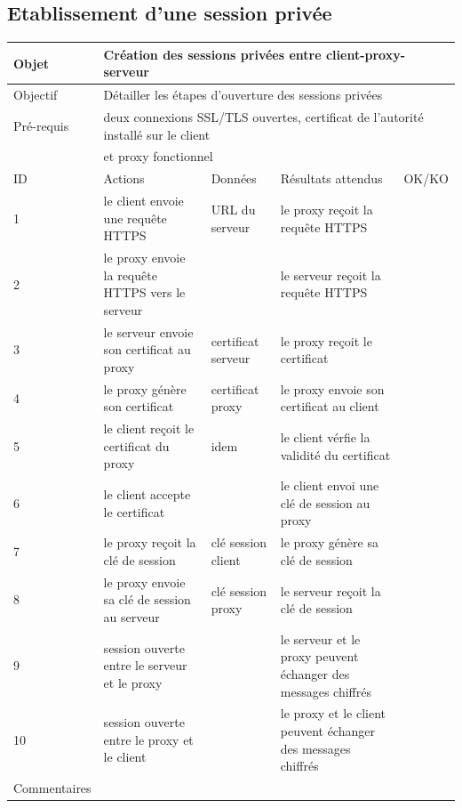 \documentclass[a4paper,11pt,french]{article}
\begin{document}
\newpage

\subsection{Etablissement d'une session privée}

\begin{tabular}{|m{2.5cm}|m{4cm}|m{3cm}|m{3.5cm}|m{2cm}|}
\hline 
\rowcolor{Blue} Objet & \multicolumn{4}{|l|}{Création des sessions privées entre client-proxy-serveur} \\ 
\hline 
\rowcolor{Blue} Objectif & \multicolumn{4}{|l|}{Détailler les étapes d'ouverture des sessions privées} \\ 
\hline 
\rowcolor{Blue} Pré-requis & \multicolumn{4}{|l|}{deux connexions SSL/TLS ouvertes, certificat de l'autorité installé sur le client} \\ 
\rowcolor{Blue} & \multicolumn{4}{|l|}{et proxy fonctionnel} \\
\hline
\rowcolor{Orange} ID & Actions & Données & Résultats attendus & OK/KO \\ 
\hline 
1 & le client envoie une requête HTTPS & URL du serveur & le proxy reçoit la requête HTTPS &  \\ 
\hline
2 & le proxy envoie la requête HTTPS vers le serveur & & le serveur reçoit la requête HTTPS & \\
\hline
3 & le serveur envoie son certificat au proxy & certificat serveur & le proxy reçoit le certificat & \\
\hline 
4 & le proxy génère son certificat & certificat proxy & le proxy envoie son certificat au client & \\
\hline
5 & le client reçoit le certificat du proxy & idem & le client vérfie la 
validité du certificat & \\
\hline
6 & le client accepte le certificat & & le client envoi une clé de session au 
proxy & \\
\hline
7 & le proxy reçoit la clé de session & clé session client & le proxy génère sa clé de session & \\
\hline
8 & le proxy envoie sa clé de session au serveur & clé session proxy & le serveur 
reçoit la clé de session & \\
\hline
9 & session ouverte entre le serveur et le proxy & & le serveur et le proxy 
peuvent échanger des messages chiffrés & \\
\hline
10 & session ouverte entre le proxy et le client & & le proxy et le client 
peuvent échanger des messages chiffrés & \\
\hline
Commentaires & \multicolumn{4}{|l|}{} \\ 
\hline
\end{tabular}
\end{document}
